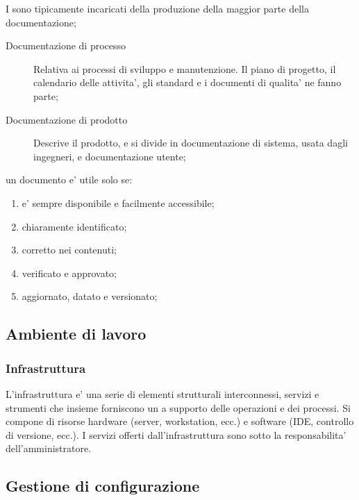 I  sono tipicamente incaricati della produzione
della maggior parte della documentazione;

\begin{description}
  \item[Documentazione di processo] Relativa ai processi di sviluppo e
    manutenzione. Il piano di progetto, il calendario delle attivita', gli
    standard e i documenti di qualita' ne fanno parte;
  \item[Documentazione di prodotto] Descrive il prodotto, e si divide in
    documentazione di sistema, usata dagli ingegneri, e documentazione utente;
\end{description}

un documento e' utile solo se:

\begin{enumerate}
	\item e' sempre disponibile e facilmente accessibile;
	\item chiaramente identificato;
	\item corretto nei contenuti;
	\item verificato e approvato;
	\item aggiornato, datato e versionato;
\end{enumerate}


\subsection{Ambiente di lavoro}


\subsubsection{Infrastruttura}

L'infrastruttura e' una serie di elementi strutturali interconnessi, servizi e
strumenti che insieme forniscono un  a supporto delle
operazioni e dei processi. Si compone di risorse hardware (server, workstation,
ecc.) e software (IDE, controllo di versione, ecc.). I servizi offerti
dall'infrastruttura sono sotto la responsabilita' dell'amministratore.

\subsection{Gestione di configurazione}

